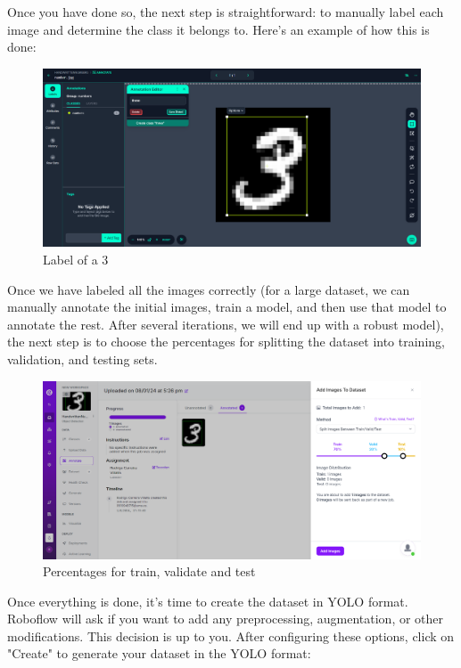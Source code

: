 \documentclass[../main]{subfiles}
\begin{document}
Once you have done so, the next step is straightforward: to manually label each image and determine the class it belongs to. Here’s an example of how this is done: 
\begin{figure}[H]
        \centering
        \includegraphics[width=1\textwidth]{./figures/three}
        \caption{Label of a 3}
        \label{fig:red}
\end{figure}
Once we have labeled all the images correctly (for a large dataset, we can manually annotate the initial images, train a model, and then use that model to annotate the rest. After several iterations, we will end up with a robust model), the next step is to choose the percentages for splitting the dataset into training, validation, and testing sets.
\begin{figure}[H]
      \centering
      \includegraphics[width=1\textwidth]{./figures/train}
      \caption{Percentages for train, validate and test}
      \label{fig:red}
\end{figure}
Once everything is done, it's time to create the dataset in YOLO format. Roboflow will ask if you want to add any preprocessing, augmentation, or other modifications. This decision is up to you. After configuring these options, click on "Create" to generate your dataset in the YOLO format:
\newpage
\end{document}
